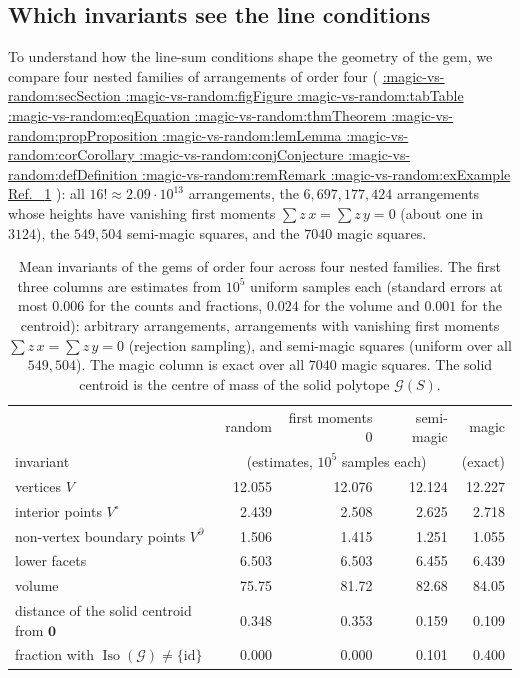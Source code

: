 \documentclass[11pt,a4paper]{article}
\makeatletter
\def\Cref@getprefix#1:#2\relax{#1}
\def\Cref@prefix@sec{sec}
\def\Cref@prefix@fig{fig}
\def\Cref@prefix@tab{tab}
\def\Cref@prefix@eq{eq}
\def\Cref@prefix@thm{thm}
\def\Cref@prefix@prop{prop}
\def\Cref@prefix@lem{lem}
\def\Cref@prefix@cor{cor}
\def\Cref@prefix@conj{conj}
\def\Cref@prefix@def{def}
\def\Cref@prefix@rem{rem}
\def\Cref@prefix@ex{ex}
\def\Cref@type@cap#1{%
  \edef\Cref@tmp{#1}%
  \ifx\Cref@tmp\Cref@prefix@sec Section%
  \else\ifx\Cref@tmp\Cref@prefix@fig Figure%
  \else\ifx\Cref@tmp\Cref@prefix@tab Table%
  \else\ifx\Cref@tmp\Cref@prefix@eq Equation%
  \else\ifx\Cref@tmp\Cref@prefix@thm Theorem%
  \else\ifx\Cref@tmp\Cref@prefix@prop Proposition%
  \else\ifx\Cref@tmp\Cref@prefix@lem Lemma%
  \else\ifx\Cref@tmp\Cref@prefix@cor Corollary%
  \else\ifx\Cref@tmp\Cref@prefix@conj Conjecture%
  \else\ifx\Cref@tmp\Cref@prefix@def Definition%
  \else\ifx\Cref@tmp\Cref@prefix@rem Remark%
  \else\ifx\Cref@tmp\Cref@prefix@ex Example%
  \else Ref.%
  \fi\fi\fi\fi\fi\fi\fi\fi\fi\fi\fi\fi
}
\DeclareRobustCommand{\Cref}[1]{%
  \begingroup
  \edef\Cref@label{#1}%
  \edef\Cref@prefix{\expandafter\Cref@getprefix\Cref@label:\relax}%
  \hyperref[#1]{\Cref@type@cap{\Cref@prefix}~\ref*{#1}}%
  \endgroup
}
\theoremstyle{plain}
\theoremstyle{definition}
\theoremstyle{remark}
\makeatother
\begin{document}
\subsection{Which invariants see the line conditions}
\label{sec:magic-vs-random}

To understand how the line-sum conditions shape the geometry of the gem, we compare four nested families of arrangements of order four (\Cref{tab:magic-vs-random}): all $16!\approx2.09\cdot10^{13}$ arrangements, the $6{,}697{,}177{,}424$ arrangements whose heights have vanishing first moments $\sum z\,x=\sum z\,y=0$ (about one in $3124$), the $549{,}504$ semi-magic squares, and the $7040$ magic squares.

\begin{table}[htbp]
\centering
\caption{Mean invariants of the gems of order four across four nested families. The first three columns are estimates from $10^5$ uniform samples each (standard errors at most $0.006$ for the counts and fractions, $0.024$ for the volume and $0.001$ for the centroid): arbitrary arrangements, arrangements with vanishing first moments $\sum z\,x=\sum z\,y=0$ (rejection sampling), and semi-magic squares (uniform over all $549{,}504$). The magic column is exact over all $7040$ magic squares. The solid centroid is the centre of mass of the solid polytope $\mathcal G(S)$.}
\label{tab:magic-vs-random}
\scriptsize
\setlength{\tabcolsep}{6pt}
\begin{tabular}{l rrrr}
\toprule
 & random & first moments $0$ & semi-magic & magic\\
invariant & \multicolumn{3}{c}{(estimates, $10^5$ samples each)} & (exact)\\
\midrule
vertices $V$ & 12.055 & 12.076 & 12.124 & 12.227\\
interior points $V^\circ$ & 2.439 & 2.508 & 2.625 & 2.718\\
non-vertex boundary points $V^\partial$ & 1.506 & 1.415 & 1.251 & 1.055\\
lower facets & 6.503 & 6.503 & 6.455 & 6.439\\
volume & 75.75 & 81.72 & 82.68 & 84.05\\
distance of the solid centroid from $\mathbf 0$ & 0.348 & 0.353 & 0.159 & 0.109\\
fraction with $\operatorname{Iso}(\mathcal G)\ne\{\mathrm{id}\}$ & 0.000 & 0.000 & 0.101 & 0.400\\
\bottomrule
\end{tabular}

\end{table}
\end{document}
